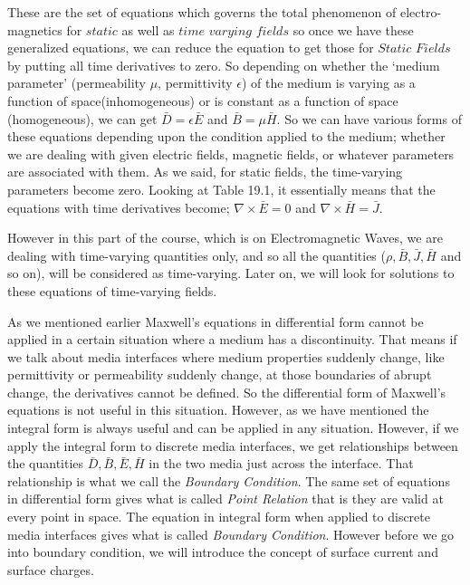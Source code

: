 These are the set of equations which governs the total phenomenon of electro-magnetics for $static$ as well as $time$ $varying$ $fields$ so once we have these generalized equations, we can reduce the equation to get those for $Static$ $Fields$ by putting all time derivatives to zero. So depending on whether the `medium parameter' (permeability $\mu$, permittivity $\epsilon$) of the medium is varying as a function of space(inhomogeneous) or is constant as a function of space (homogeneous), we can get $\bar{D}=\epsilon\bar{E}$ and $\bar{B}=\mu\bar{H}$. So we can have various forms of these equations depending upon the condition applied to the medium; whether we are dealing with given electric fields, magnetic fields, or whatever parameters are associated with them. As we said, for static fields, the time-varying parameters become zero. Looking at Table 19.1, it essentially means that the equations with time derivatives become; $\nabla\times\bar{E}=0$ and $\nabla\times\bar{H}=\bar{J}$.

However in this part of the course, which is on Electromagnetic Waves, we are dealing with time-varying quantities only, and so all the quantities ($\rho,\bar{B},\bar{J},\bar{H}$ and so on), will be considered as time-varying. Later on, we will look for solutions to these equations of time-varying fields.

As we mentioned earlier Maxwell's equations in differential form cannot be applied in a certain situation where a medium has a discontinuity. That means if we talk about media interfaces where medium properties suddenly change, like permittivity or permeability suddenly change, at those boundaries of abrupt change, the derivatives cannot be defined. So the differential form of Maxwell's equations is not useful in this situation. However, as we have mentioned the integral form is always useful and can be applied in any situation. However, if we apply the integral form to discrete media interfaces, we get relationships between the quantities $\bar{D}, \bar{B}, \bar{E}, \bar{H}$ in the two media just across the interface. That relationship is what we call the \emph{Boundary Condition}. The same set of equations in differential form gives what is called \emph{Point Relation} that is they are valid at every point in space. The equation in integral form when applied to discrete media interfaces gives what is called \emph{Boundary Condition}. However before we go into boundary condition, we will introduce the concept of surface current and surface charges.

